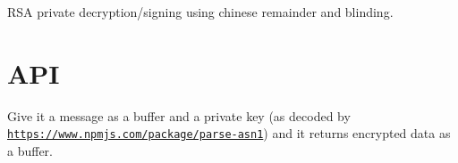 \href{https://travis-ci.org/crypto-browserify/browserify-rsa}{\tt }

R\+SA private decryption/signing using chinese remainder and blinding.

\section*{A\+PI }

Give it a message as a buffer and a private key (as decoded by \href{https://www.npmjs.com/package/parse-asn1}{\tt https\+://www.\+npmjs.\+com/package/parse-\/asn1}) and it returns encrypted data as a buffer. 